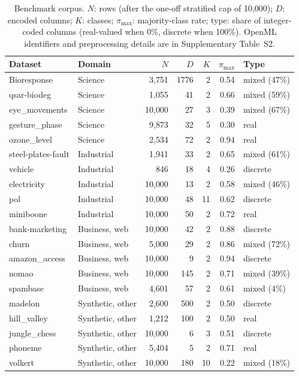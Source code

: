 \begin{table}[t]
\centering
\footnotesize
\caption{Benchmark corpus. $N$: rows (after the one-off stratified cap of 10{,}000); $D$: encoded columns; $K$: classes; $\pi_{\max}$: majority-class rate; type: share of integer-coded columns (real-valued when 0\%, discrete when 100\%). OpenML identifiers and preprocessing details are in Supplementary Table~S2.}
\label{tab:inventory}
\begin{tabular}{@{}llrrrrl@{}}
\toprule
Dataset & Domain & $N$ & $D$ & $K$ & $\pi_{\max}$ & Type \\
\midrule
Bioresponse & Science & 3{,}751 & 1776 & 2 & 0.54 & mixed (47\%) \\
qsar-biodeg & Science & 1{,}055 & 41 & 2 & 0.66 & mixed (59\%) \\
eye\_movements & Science & 10{,}000 & 27 & 3 & 0.39 & mixed (67\%) \\
gesture\_phase & Science & 9{,}873 & 32 & 5 & 0.30 & real \\
ozone\_level & Science & 2{,}534 & 72 & 2 & 0.94 & real \\
steel-plates-fault & Industrial & 1{,}941 & 33 & 2 & 0.65 & mixed (61\%) \\
vehicle & Industrial & 846 & 18 & 4 & 0.26 & discrete \\
electricity & Industrial & 10{,}000 & 13 & 2 & 0.58 & mixed (46\%) \\
pol & Industrial & 10{,}000 & 48 & 11 & 0.62 & discrete \\
miniboone & Industrial & 10{,}000 & 50 & 2 & 0.72 & real \\
bank-marketing & Business{,} web & 10,000 & 42 & 2 & 0.88 & discrete \\
churn & Business{,} web & 5,000 & 29 & 2 & 0.86 & mixed (72\%) \\
amazon\_access & Business{,} web & 10,000 & 9 & 2 & 0.94 & discrete \\
nomao & Business{,} web & 10,000 & 145 & 2 & 0.71 & mixed (39\%) \\
spambase & Business{,} web & 4,601 & 57 & 2 & 0.61 & mixed (4\%) \\
madelon & Synthetic{,} other & 2,600 & 500 & 2 & 0.50 & discrete \\
hill\_valley & Synthetic{,} other & 1,212 & 100 & 2 & 0.50 & real \\
jungle\_chess & Synthetic{,} other & 10,000 & 6 & 3 & 0.51 & discrete \\
phoneme & Synthetic{,} other & 5,404 & 5 & 2 & 0.71 & real \\
volkert & Synthetic{,} other & 10,000 & 180 & 10 & 0.22 & mixed (18\%) \\
\bottomrule
\end{tabular}
\end{table}

